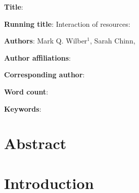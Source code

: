 \documentclass[a4paper]{article}
\begin{document}
\noindent
\textbf{Title}: 

\bigskip

\noindent
\textbf{Running title}: Interaction of resources: 

\bigskip

\noindent
\textbf{Authors}: Mark Q. Wilber$^1$, Sarah Chinn, 

\bigskip

\noindent
\textbf{Author affiliations}: \\

\bigskip

\noindent
\textbf{Corresponding author}:

\bigskip

\noindent
\textbf{Word count}:

\bigskip

\noindent
\textbf{Keywords}:

\newpage

\doublespacing
\linenumbers

\section*{Abstract}

\section*{Introduction}







\end{document}
